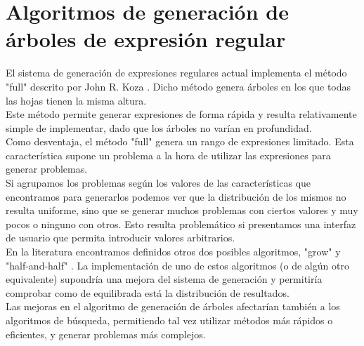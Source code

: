 
\section{Algoritmos de generación de árboles de expresión regular}
El sistema de generación de expresiones regulares actual implementa el método "full" descrito por John R. Koza \cite{koza92}.
Dicho método genera árboles en los que todas las hojas tienen la misma altura.
\\
Este método permite generar expresiones de forma rápida y resulta relativamente simple de implementar, dado que los árboles no varían en profundidad.
\\
Como desventaja, el método "full" genera un rango de expresiones limitado.
Esta característica supone un problema a la hora de utilizar las expresiones para generar problemas.
\\
Si agrupamos los problemas según los valores de las características que encontramos para generarlos podemos ver que la distribución de los mismos no resulta uniforme, sino que se generar muchos problemas con ciertos valores y muy pocos o ninguno con otros.
Esto resulta problemático si presentamos una interfaz de usuario que permita introducir valores arbitrarios.
\\
En la literatura encontramos definidos otros dos posibles algoritmos, "grow" y "half-and-half" \cite{koza92}.
La implementación de uno de estos algoritmos (o de algún otro equivalente) supondría una mejora del sistema de generación y permitiría comprobar como de equilibrada está la distribución de resultados.
\\
Las mejoras en el algoritmo de generación de árboles afectarían también a los algoritmos de búsqueda, permitiendo tal vez utilizar métodos más rápidos o eficientes, y generar problemas más complejos.